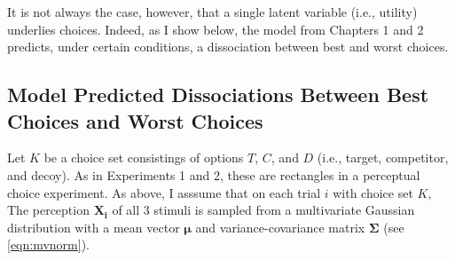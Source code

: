 It is not always the case, however, that a single latent variable (i.e., utility) underlies choices. Indeed, as I show below, the model from Chapters 1 and 2 predicts, under certain conditions, a dissociation between best and worst choices.

\subsection{Model Predicted Dissociations Between Best Choices and Worst Choices}

Let $K$ be a choice set consistings of options $T$, $C$, and $D$ (i.e., target, competitor, and decoy). As in Experiments 1 and 2, these are rectangles in a perceptual choice experiment. As above, I asssume that on each trial $i$ with choice set $K$, The perception $\mathbf{X_i}$ of all 3 stimuli is sampled from a multivariate Gaussian distribution with a mean vector $\mathbf{\mu}$ and variance-covariance matrix $\mathbf{\Sigma}$ (see \ref{eqn:mvnorm}).

